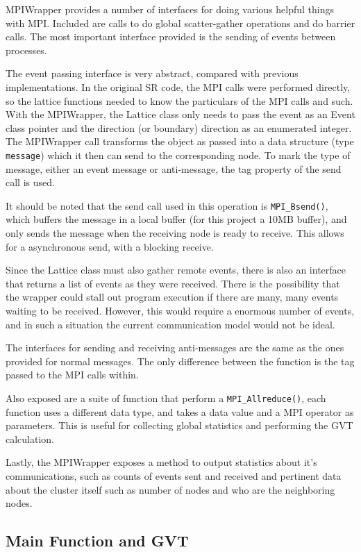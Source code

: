 MPIWrapper provides a number of interfaces for doing various helpful things with MPI.  Included are calls to do global scatter-gather operations and do barrier calls.  The most important interface provided is the sending of events between processes.

The event passing interface is very abstract, compared with previous implementations.  In the original SR code, the MPI calls were performed directly, so the lattice functions needed to know the particulars of the MPI calls and such.  With the MPIWrapper, the Lattice class only needs to pass the event as an Event class pointer and the direction (or boundary) direction as an enumerated integer.  The MPIWrapper call transforms the object as passed into a data structure (type \texttt{message}) which it then can send to the corresponding node.  To mark the type of message, either an event message or anti-message, the tag property of the send call is used.

It should be noted that the send call used in this operation is \texttt{MPI\_Bsend()}, which buffers the message in a local buffer (for this project a 10MB buffer), and only sends the message when the receiving node is ready to receive.  This allows for a asynchronous send, with a blocking receive.

Since the Lattice class must also gather remote events, there is also an interface that returns a list of events as they were received.  There is the possibility that the wrapper could stall out program execution if there are many, many events waiting to be received.  However, this would require a enormous number of events, and in such a situation the current communication model would not be ideal.

The interfaces for sending and receiving anti-messages are the same as the ones provided for normal messages.  The only difference between the function is the tag passed to the MPI calls within.

Also exposed are a suite of function that perform a \texttt{MPI\_Allreduce()}, each function uses a different data type, and takes a data value and a MPI operator as parameters.  This is useful for collecting global statistics and performing the GVT calculation.

Lastly, the MPIWrapper exposes a method to output statistics about it's communications, such as counts of events sent and received and pertinent data about the cluster itself such as number of nodes and who are the neighboring nodes.

\subsection{Main Function and GVT}

